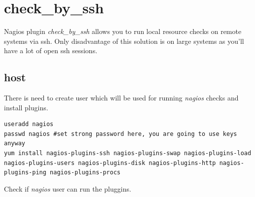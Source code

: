 \documentclass[10pt,a4paper,final]{report}
\begin{document}
\section{check\_by\_ssh}
Nagios plugin \emph{check\_by\_ssh} allows you to run local resource checks on remote systems via ssh. Only disadvantage of this solution is on large systems as you'll have a lot of open ssh sessions.
\subsection{host}
There is need to create user which will be used for running \emph{nagios} checks and install plugins.
\begin{lstlisting}
useradd nagios
passwd nagios #set strong password here, you are going to use keys anyway
yum install nagios-plugins-ssh nagios-plugins-swap nagios-plugins-load nagios-plugins-users nagios-plugins-disk nagios-plugins-http nagios-plugins-ping nagios-plugins-procs
\end{lstlisting}
Check if \emph{nagios} user can run the pluggins.
\end{document}
